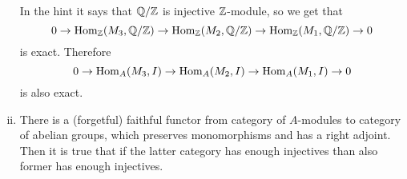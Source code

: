 \begin{exercise}{4}
\begin{enumerate}[i)]
{                In the hint it says that $\mathbb{Q} / \mathbb{Z}$ is injective $\mathbb{Z}$-module, so
                we get that
                \begin{equation*}
                    0 \to \operatorname{Hom}_{\mathbb{Z}}(M_3, \mathbb{Q} / \mathbb{Z}) \to \operatorname{Hom}_{\mathbb{Z}}(M_2, \mathbb{Q} / \mathbb{Z}) \to
                    \operatorname{Hom}_{\mathbb{Z}}(M_1, \mathbb{Q} / \mathbb{Z}) \to 0
                \end{equation*}
                is exact.
                Therefore
                \begin{equation*}
                    0 \to \operatorname{Hom}_A(M_3, I) \to \operatorname{Hom}_A(M_2, I) \to \operatorname{Hom}_A(M_1, I)
                    \to 0
                \end{equation*}
                is also exact.
            }
        \item{
                There is a (forgetful) faithful functor from category of $A$-modules to
                category of abelian groups, which preserves monomorphisms and
                has a right adjoint. Then it is true that if the latter category
                has enough injectives than also former has enough injectives.
            }
    \end{enumerate}
\end{exercise}


